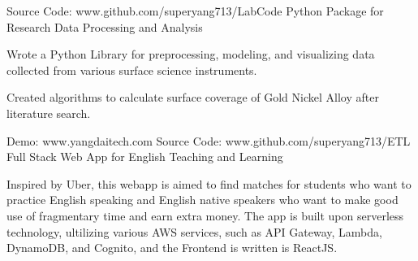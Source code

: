 


\begin{cventries}


\cventry
{Source Code: www.github.com/superyang713/LabCode}
{Python Package for Research Data Processing and Analysis}
{}
{}
{
\begin{cvitems}
\item {Wrote a Python Library for preprocessing, modeling, and visualizing data
    collected from various surface science instruments.}
\item {Created algorithms to calculate surface coverage of Gold Nickel Alloy
    after literature search.}
\end{cvitems}
}


\cventry
{Demo: www.yangdaitech.com   Source Code: www.github.com/superyang713/ETL}
{Full Stack Web App for English Teaching and Learning}
{}
{}
{
\begin{cvitems}
\item {Inspired by Uber, this webapp is aimed to find matches for students who
    want to practice English speaking and English native speakers who want to
    make good use of fragmentary time and earn extra money. The app is built
    upon serverless technology, ultilizing various AWS services, such as API
    Gateway, Lambda, DynamoDB, and Cognito, and the Frontend is written is
    ReactJS.}
\end{cvitems}
}


\end{cventries}


